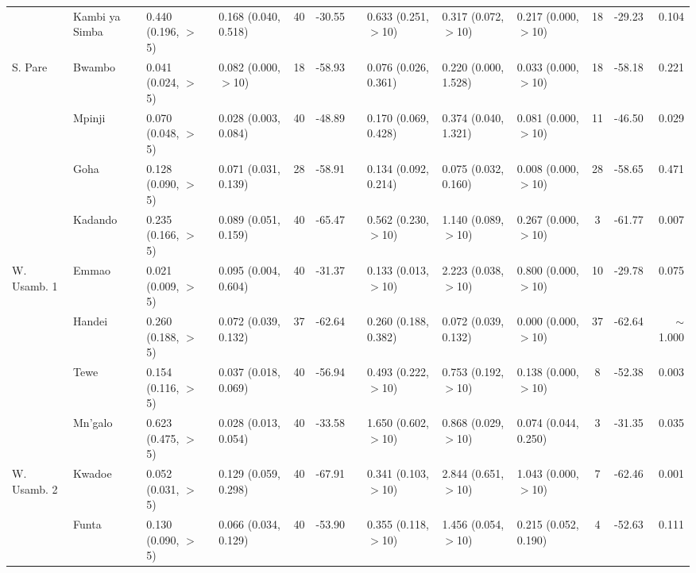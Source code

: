 \begin{tabular}{llllclllllclr}
            & Kambi ya Simba & 0.440 (0.196, $>$5)    & 0.168 (0.040, 0.518)   & 40   & -30.55   & & 0.633 (0.251, $>$10)   & 0.317 (0.072, $>$10)   & 0.217 (0.000, $>$10)   & 18   & -29.23   & 0.104\\
\cmidrule{2-13}
S. Pare     & Bwambo         & 0.041 (0.024, $>$5)    & 0.082 (0.000, $>$10)   & 18   & -58.93   & & 0.076 (0.026, 0.361)   & 0.220 (0.000, 1.528)   & 0.033 (0.000, $>$10)   & 18   & -58.18   & 0.221\\
            & Mpinji         & 0.070 (0.048, $>$5)    & 0.028 (0.003, 0.084)   & 40   & -48.89   & & 0.170 (0.069, 0.428)   & 0.374 (0.040, 1.321)   & 0.081 (0.000, $>$10)   & 11   & -46.50   & 0.029\\
            & Goha           & 0.128 (0.090, $>$5)    & 0.071 (0.031, 0.139)   & 28   & -58.91   & & 0.134 (0.092, 0.214)   & 0.075 (0.032, 0.160)   & 0.008 (0.000, $>$10)   & 28   & -58.65   & 0.471\\
            & Kadando        & 0.235 (0.166, $>$5)    & 0.089 (0.051, 0.159)   & 40   & -65.47   & & 0.562 (0.230, $>$10)   & 1.140 (0.089, $>$10)   & 0.267 (0.000, $>$10)   & 3    & -61.77   & 0.007\\
\cmidrule{2-13}
W. Usamb. 1 & Emmao          & 0.021 (0.009, $>$5)    & 0.095 (0.004, 0.604)   & 40   & -31.37   & & 0.133 (0.013, $>$10)   & 2.223 (0.038, $>$10)   & 0.800 (0.000, $>$10)   & 10   & -29.78   & 0.075\\
            & Handei         & 0.260 (0.188, $>$5)    & 0.072 (0.039, 0.132)   & 37   & -62.64   & & 0.260 (0.188, 0.382)   & 0.072 (0.039, 0.132)   & 0.000 (0.000, $>$10)   & 37   & -62.64   & $\sim$1.000\\
            & Tewe           & 0.154 (0.116, $>$5)    & 0.037 (0.018, 0.069)   & 40   & -56.94   & & 0.493 (0.222, $>$10)   & 0.753 (0.192, $>$10)   & 0.138 (0.000, $>$10)   & 8    & -52.38   & 0.003\\
            & Mn'galo        & 0.623 (0.475, $>$5)    & 0.028 (0.013, 0.054)   & 40   & -33.58   & & 1.650 (0.602, $>$10)   & 0.868 (0.029, $>$10)   & 0.074 (0.044, 0.250)   & 3    & -31.35   & 0.035\\
\cmidrule{2-13}
W. Usamb. 2 & Kwadoe         & 0.052 (0.031, $>$5)    & 0.129 (0.059, 0.298)   & 40   & -67.91   & & 0.341 (0.103, $>$10)   & 2.844 (0.651, $>$10)   & 1.043 (0.000, $>$10)   & 7    & -62.46   & 0.001\\
            & Funta          & 0.130 (0.090, $>$5)    & 0.066 (0.034, 0.129)   & 40   & -53.90   & & 0.355 (0.118, $>$10)   & 1.456 (0.054, $>$10)   & 0.215 (0.052, 0.190)   & 4    & -52.63   & 0.111\\

\end{tabular}
